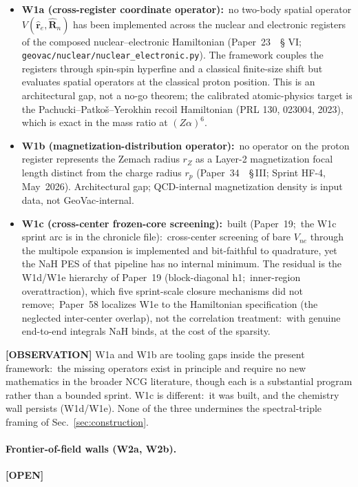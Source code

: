 \documentclass[11pt]{article}
\begin{document}
\begin{itemize}\setlength{\itemsep}{2pt}
\item \textbf{W1a (cross-register coordinate operator):}\ no two-body
spatial operator $V(\hat{\mathbf{r}}_e, \hat{\mathbf{R}}_n)$ has been
implemented across the nuclear and electronic registers of the
composed nuclear--electronic Hamiltonian (Paper~23~\cite{paper23}~\S
VI; \texttt{geovac/nuclear/nuclear\_electronic.py}).  The framework
couples the registers through spin-spin hyperfine and a classical
finite-size shift but evaluates spatial operators at the classical
proton position.  This is an architectural gap, not a no-go theorem;
the calibrated atomic-physics target is the
Pachucki--Patko\v{s}--Yerokhin recoil Hamiltonian (PRL 130, 023004,
2023), which is exact in the mass ratio at $(Z\alpha)^6$.
\item \textbf{W1b (magnetization-distribution operator):}\ no
operator on the proton register represents the Zemach radius
$r_Z$ as a Layer-2 magnetization focal length distinct from the
charge radius $r_p$ (Paper~34~\cite{paper34}~\S\,III; Sprint HF-4,
May~2026).  Architectural gap; QCD-internal magnetization density is
input data, not GeoVac-internal.
\item \textbf{W1c (cross-center frozen-core screening):}\ built
(Paper~19;\ the W1c sprint arc is in the chronicle file):\ cross-center screening of bare $V_{ne}$ through
the multipole expansion is implemented and bit-faithful to quadrature,
yet the NaH PES of that pipeline has no internal minimum.  The residual
is the W1d/W1e hierarchy of Paper~19 (block-diagonal h1;\ inner-region
overattraction), which five sprint-scale closure mechanisms did not
remove;\ Paper~58 localizes W1e to the Hamiltonian specification (the
neglected inter-center overlap), not the correlation treatment:\ with
genuine end-to-end integrals NaH binds, at the cost of the sparsity.
\end{itemize}

\textbf{[OBSERVATION]} W1a and W1b are tooling gaps inside the present
framework:\ the missing operators exist in principle and require no
new mathematics in the broader NCG literature, though each is a
substantial program rather than a bounded sprint.  W1c is different:\
it was built, and the chemistry wall persists (W1d/W1e).  None of the
three undermines the spectral-triple framing of
Sec.~\ref{sec:construction}.

\paragraph{Frontier-of-field walls (W2a, W2b).}
\textbf{[OPEN]}
\end{document}
